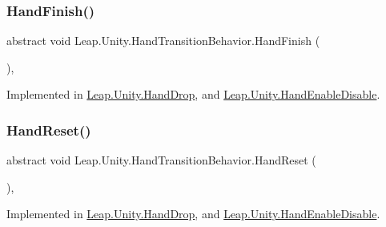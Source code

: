 \subsubsection{\texorpdfstring{HandFinish()}{HandFinish()}}
{\footnotesize\ttfamily abstract void Leap.\+Unity.\+Hand\+Transition\+Behavior.\+Hand\+Finish (\begin{DoxyParamCaption}{ }\end{DoxyParamCaption})\hspace{0.3cm}{\ttfamily [protected]}, {}}



Implemented in \mbox{\hyperlink{class_leap_1_1_unity_1_1_hand_drop_acecfd782c8bd61539dbbdd0bf1778f4b}{Leap.\+Unity.\+Hand\+Drop}}, and \mbox{\hyperlink{class_leap_1_1_unity_1_1_hand_enable_disable_a7d1c22f4a35fbe6bb4af5e204f8b4d66}{Leap.\+Unity.\+Hand\+Enable\+Disable}}.

\mbox{\label{class_leap_1_1_unity_1_1_hand_transition_behavior_ae0a27730cfec3d323289ef7d4ef950d7}} 
\subsubsection{\texorpdfstring{HandReset()}{HandReset()}}
{\footnotesize\ttfamily abstract void Leap.\+Unity.\+Hand\+Transition\+Behavior.\+Hand\+Reset (\begin{DoxyParamCaption}{ }\end{DoxyParamCaption})\hspace{0.3cm}{\ttfamily [protected]}, {}}



Implemented in \mbox{\hyperlink{class_leap_1_1_unity_1_1_hand_drop_aa553110438e7eaee2617cc3f9e19a7a2}{Leap.\+Unity.\+Hand\+Drop}}, and \mbox{\hyperlink{class_leap_1_1_unity_1_1_hand_enable_disable_abb2a2d549b1b674201f32afc08994787}{Leap.\+Unity.\+Hand\+Enable\+Disable}}.

\mbox{\label{class_leap_1_1_unity_1_1_hand_transition_behavior_a67061c97a527630c18621993e58d0207}} 
